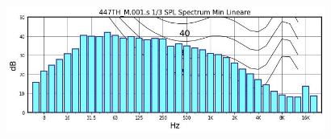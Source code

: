 \documentclass[11pt]{article}
\begin{document}
\begin{figure}[!htb]
\centering
     \includegraphics[width=0.93\textwidth]{-SPL!min!plot-}%
\end{figure}
\end{document}
